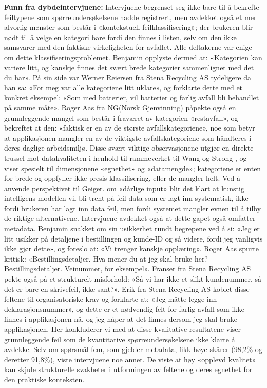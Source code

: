 \newline
\textbf{Funn fra dybdeintervjuene: }
Intervjuene begrenset seg ikke bare til å bekrefte feiltypene som spørreundersøkelsene hadde registrert, men avdekket også et mer alvorlig mønster som består i «kontekstuell feilklassifisering»; der brukeren blir nødt til å velge en kategori bare fordi den finnes i listen, selv om den ikke samsvarer med den faktiske virkeligheten for avfallet.
Alle deltakerne var enige om dette klassifiseringsproblemet. Benjamin opplyste dermed at: «Kategorien kan variere litt, og kanskje finnes det svært brede kategorier sammenlignet med det du har». På sin side var Werner Reiersen fra Stena Recycling AS tydeligere da han sa: «For meg var alle kategoriene litt uklare», og forklarte dette med et konkret eksempel: «Som med batterier, vil batterier og farlig avfall bli behandlet på samme måte». Roger Aas fra NG(Norsk Gjenvinning) påpekte også en grunnleggende mangel som består i fraværet av kategorien «restavfall», og bekreftet at den: «faktisk er en av de største avfallskategoriene», noe som betyr at applikasjonen mangler en av de viktigste avfallskategoriene som håndteres i deres daglige arbeidsmiljø.
Disse svært viktige observasjonene utgjør en direkte trussel mot datakvaliteten i henhold til rammeverket til Wang og Strong \cite{wang1996}, og viser spesielt til dimensjonene «egnethet» og «datamengde»; kategoriene er enten for brede og oppfyller ikke presis klassifisering, eller de mangler helt. Ved å anvende perspektivet til Geiger. \cite{geiger2021} om «dårlige input» blir det klart at kunstig intelligens-modellen vil bli trent på feil data som er lagt inn systematisk, ikke fordi brukeren har lagt inn data feil, men fordi systemet mangler evnen til å tilby de riktige alternativene.
Intervjuene avdekket også at dette gapet også omfatter metadata. Benjamin snakket om sin usikkerhet rundt begrepene ved å si: «Jeg er litt usikker på detaljene i bestillingen og kunde-ID og så videre, fordi jeg vanligvis ikke gjør dette», og foreslo at: «Vi trenger kanskje opplæring». Roger Aas spurte kritisk: «Bestillingsdetaljer. Hva mener du at jeg skal bruke her? Bestillingsdetaljer. Veinummer, for eksempel». Franser fra Stena Recycling AS pekte også på et strukturelt misforhold: «Så vi har ikke et slikt kundenummer, så det er bare en skrivefeil, ikke sant?». Erik fra Stena Recycling AS koblet disse feltene til organisatoriske krav og forklarte at: «Jeg måtte legge inn deklarasjonsnummer», og dette er et nødvendig felt for farlig avfall som ikke finnes i applikasjonen nå, og jeg håper at det finnes dersom jeg skal bruke applikasjonen.
Her konkluderer vi med at disse kvalitative resultatene viser grunnleggende feil som de kvantitative spørreundersøkelsene ikke klarte å avdekke. Selv om spørsmål fem, som gjelder metadata, fikk høye skårer (98,2\% og deretter 91,8\%), viste intervjuene noe annet. De viste at høy «opplevd kvalitet» kan skjule strukturelle svakheter i utformingen av feltene og deres egnethet for den praktiske konteksten.





